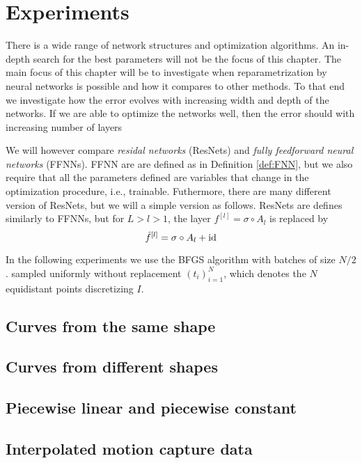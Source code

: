 
\section{Experiments}\label{sec:experiments}
There is a wide range of network structures and optimization algorithms. An in-depth search for the best parameters will not be the focus of this chapter. The main focus of this chapter will be to investigate when reparametrization by neural networks is possible and how it compares to other methods. To that end we investigate how the error evolves with increasing width and depth of the networks. If we are able to optimize the networks well, then the error should with increasing number of layers

We will however compare \emph{residal networks} (ResNets) and \emph{fully feedforward neural networks} (FFNNs). FFNN are are defined as in Definition \ref{def:FNN}, but we also require that all the parameters defined are variables that change in the optimization procedure, i.e., trainable. Futhermore, there are many different version of ResNets, but we will a simple version as follows. ResNets are defines similarly to FFNNs, but for \(L>l>1\), the layer \(f^{[l]} = \sigma \circ A_l\) is replaced by 
\begin{equation*}
   \hat f^{[l]} = \sigma \circ A_l + \text{id}
\end{equation*} 

In the following experiments we use the BFGS algorithm with batches of size \(N/2\).  sampled uniformly without replacement \({(t_i)}_{i=1}^N\), which denotes the \(N\) equidistant points discretizing \(I\). 



\subsection{Curves from the same shape}\label{subsec:case_1}


\FloatBarrier
\subsection{Curves from different shapes}\label{subsec:case_2}


\FloatBarrier
\subsection{Piecewise linear and piecewise constant}


\FloatBarrier
\subsection{Interpolated motion capture data}

